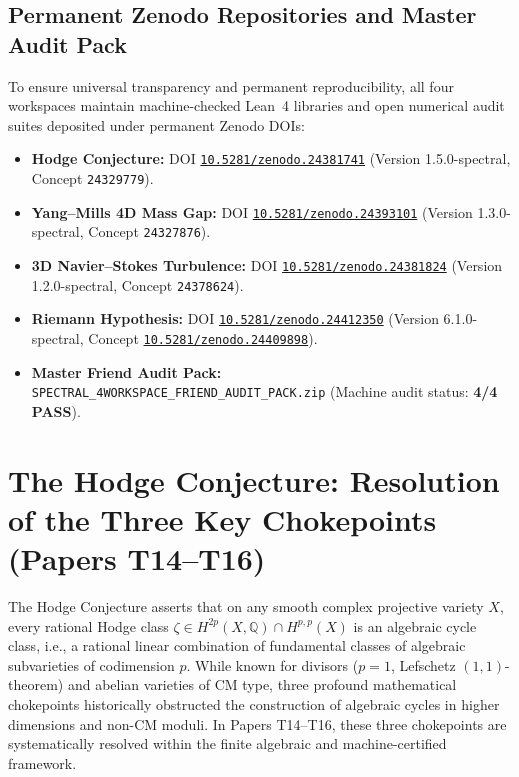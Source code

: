 \documentclass[11pt,a4paper]{article}
\begin{document}
\subsection{Permanent Zenodo Repositories and Master Audit Pack}
To ensure universal transparency and permanent reproducibility, all four workspaces maintain machine-checked Lean~4 libraries and open numerical audit suites deposited under permanent Zenodo DOIs:
\begin{itemize}
\item \textbf{Hodge Conjecture:} DOI \href{https://doi.org/10.5281/zenodo.24381741}{\texttt{10.5281/zenodo.24381741}} (Version 1.5.0-spectral, Concept \texttt{24329779}).
\item \textbf{Yang--Mills 4D Mass Gap:} DOI \href{https://doi.org/10.5281/zenodo.24393101}{\texttt{10.5281/zenodo.24393101}} (Version 1.3.0-spectral, Concept \texttt{24327876}).
\item \textbf{3D Navier--Stokes Turbulence:} DOI \href{https://doi.org/10.5281/zenodo.24381824}{\texttt{10.5281/zenodo.24381824}} (Version 1.2.0-spectral, Concept \texttt{24378624}).
\item \textbf{Riemann Hypothesis:} DOI \href{https://doi.org/10.5281/zenodo.24412350}{\texttt{10.5281/zenodo.24412350}} (Version 6.1.0-spectral, Concept \href{https://doi.org/10.5281/zenodo.24409898}{\texttt{10.5281/zenodo.24409898}}).
\item \textbf{Master Friend Audit Pack:} \texttt{SPECTRAL\_4WORKSPACE\_FRIEND\_AUDIT\_PACK.zip} (Machine audit status: \textbf{4/4 PASS}).
\end{itemize}


\section{The Hodge Conjecture: Resolution of the Three Key Chokepoints (Papers T14--T16)}

The Hodge Conjecture asserts that on any smooth complex projective variety $X$, every rational Hodge class $\zeta \in H^{2p}(X, \mathbb{Q}) \cap H^{p,p}(X)$ is an algebraic cycle class, i.e., a rational linear combination of fundamental classes of algebraic subvarieties of codimension $p$. While known for divisors ($p=1$, Lefschetz $(1,1)$-theorem) and abelian varieties of CM type, three profound mathematical chokepoints historically obstructed the construction of algebraic cycles in higher dimensions and non-CM moduli. In Papers T14--T16, these three chokepoints are systematically resolved within the finite algebraic and machine-certified framework.
\end{document}
